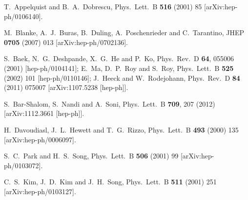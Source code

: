 \begin{thebibliography}{99}
 T.~Appelquist and B.~A.~Dobrescu, 
Phys.\ Lett.\ B
\textbf{516}
(2001) 85 [arXiv:hep-ph/0106140]. %

  M.~Blanke, A.~J.~Buras, B.~Duling, A.~Poschenrieder and C.~Tarantino,
  JHEP {\bf 0705} (2007) 013
  [arXiv:hep-ph/0702136].


  S.~Baek, N.~G.~Deshpande, X.~G.~He and P.~Ko,
  Phys.\ Rev.\ D {\bf 64}, 055006 (2001)
  [hep-ph/0104141];
  E.~Ma, D.~P.~Roy and S.~Roy,
  Phys.\ Lett.\ B {\bf 525} (2002) 101
  [hep-ph/0110146];
%
  J.~Heeck and W.~Rodejohann,
  Phys.\ Rev.\ D {\bf 84} (2011) 075007
  [arXiv:1107.5238 [hep-ph]].

  S.~Bar-Shalom, S.~Nandi and A.~Soni,
  Phys.\ Lett.\ B {\bf 709}, 207 (2012)
  [arXiv:1112.3661 [hep-ph]].


  H.~Davoudiasl, J.~L.~Hewett and T.~G.~Rizzo,
  Phys.\ Lett.\  B {\bf 493} (2000) 135
  [arXiv:hep-ph/0006097].

S.~C.~Park and H.~S.~Song,
Phys.\ Lett.\  B {\bf 506} (2001) 99 [arXiv:hep-ph/0103072].

  C.~S.~Kim, J.~D.~Kim and J.~H.~Song,
  Phys.\ Lett.\  B {\bf 511} (2001) 251
  [arXiv:hep-ph/0103127].


\end{thebibliography}

